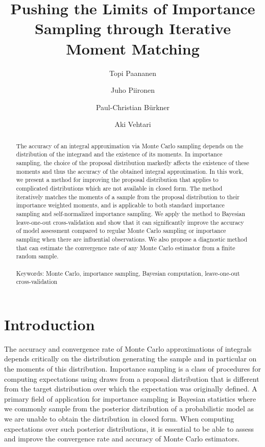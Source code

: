 \documentclass[12pt]{article}
\title{\bf Pushing the Limits of Importance Sampling through Iterative Moment Matching}
\author{ Topi Paananen \and Juho Piironen \and Paul-Christian B\"urkner \and Aki Vehtari }
\begin{document}
\maketitle


\begin{abstract}
\noindent The accuracy of an integral approximation via 
Monte Carlo sampling depends on the distribution of the integrand and
the existence of its moments.
In importance sampling, the choice of the proposal distribution
markedly affects the existence of these moments and thus 
the accuracy of the obtained integral approximation. 
In this work, we present a method for improving the
proposal distribution that applies to complicated distributions which
are not available in closed form.
The method iteratively matches the moments of a sample from the proposal distribution
to their importance weighted moments, and is applicable to both standard 
importance sampling and self-normalized importance sampling.
We apply the method to Bayesian leave-one-out cross-validation
and show that it can significantly improve the accuracy
of model assessment compared to regular Monte Carlo sampling or importance 
sampling when there are influential observations.
We also propose a diagnostic method that can estimate the convergence rate of
any Monte Carlo estimator from a finite random sample.
\\
\\
Keywords: Monte Carlo, importance sampling, Bayesian computation, leave-one-out cross-validation
\end{abstract}




\section{Introduction}



The accuracy and convergence rate of Monte Carlo approximations of integrals 
depends critically on the distribution generating the sample and in particular
on the moments of this distribution. Importance sampling is a class of procedures
for computing expectations using draws from a proposal
distribution that is different from the target distribution over which the 
expectation was originally defined. A primary field of application for
importance sampling is Bayesian statistics where we commonly sample
from the posterior distribution of a probabilistic model as we are unable 
to obtain the distribution in closed form.
When computing expectations over such posterior distributions,
it is essential to be able to assess and improve the convergence rate
and accuracy of Monte Carlo estimators.
\end{document}
